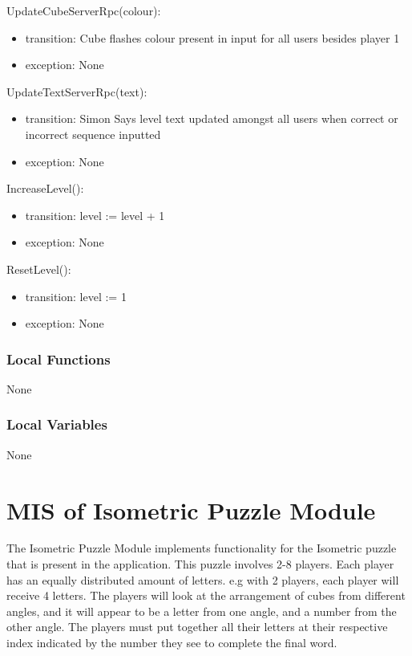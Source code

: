 \documentclass[12pt, titlepage]{article}
\begin{document}
\noindent UpdateCubeServerRpc(colour):
\begin{itemize}
\item transition: Cube flashes colour present in input for all users besides player 1
\item exception: None
\end{itemize}

\noindent UpdateTextServerRpc(text):
\begin{itemize}
\item transition: Simon Says level text updated amongst all users when correct or incorrect sequence inputted
\item exception: None
\end{itemize}

\noindent IncreaseLevel():
\begin{itemize}
\item transition: level := level + 1
\item exception: None
\end{itemize}

\noindent ResetLevel():
\begin{itemize}
\item transition: level := 1
\item exception: None
\end{itemize}

\subsubsection{Local Functions}
None
\subsubsection{Local Variables}
None
\newpage

\section{MIS of Isometric Puzzle Module} \label{sec:Code}
\noindent The Isometric Puzzle Module implements functionality for the Isometric puzzle that is present in the application. This puzzle involves 2-8 players. Each player has an equally distributed amount of letters. e.g with 2 players, each player will receive 4 letters. The players will look at the arrangement of cubes from different angles, and it will appear to be a letter from one angle, and a number from the other angle. The players must put together all their letters at their respective index indicated by the number they see to complete the final word.
\end{document}
